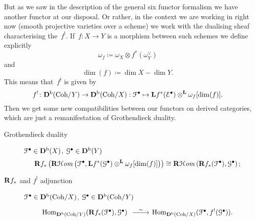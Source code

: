 But as we saw in the description of the general six functor formalism we have another functor at our disposal. Or rather, in the context we are working in right now (smooth projective varieties over a scheme) we work with the dualising sheaf characterising the~$f^!$. If~$f\colon X\to Y$ is a morphism between such schemes we define explicitly
\begin{equation}
  \omega_f\coloneqq\omega_X\otimes f^*(\omega_Y^\vee)
\end{equation}
and
\begin{equation}
  \dim(f)\coloneqq\dim X-\dim Y.
\end{equation}
This means that~$f^!$ is given by
\begin{equation}
  f^!\colon\mathbf{D}^{\mathrm{b}}(\mathrm{Coh}/Y)\to\mathbf{D}^{\mathrm{b}}(\mathrm{Coh}/X):\mathcal{F}^\bullet\mapsto\mathbf{L} f^*(\mathcal{E}^\bullet)\otimes^{\mathbf{L}}\omega_f[\dim(f)].
\end{equation}
Then we get some new compatibilities between our functors on derived categories, which are just a remanifestation of Grothendieck duality.
\begin{description}
  \item[Grothendieck duality] $\mathcal{F}^\bullet\in\mathbf{D}^{\mathrm{b}}(X)$, $\mathcal{G}^\bullet\in\mathbf{D}^{\mathrm{b}}(Y)$
    \begin{equation}
      \mathbf{R} f_*\left( \operatorname{\mathbf{R}\mathcal{H}\mathit{om}}\left( \mathcal{F}^\bullet,\mathbf{L} f^*(\mathcal{G}^\bullet)\otimes^{\mathbf{L}}\omega_f[\dim(f)] \right) \right)\cong\operatorname{\mathbf{R}\mathcal{H}\mathit{om}}\left( \mathbf{R} f_*(\mathcal{F}^\bullet),\mathcal{G}^\bullet \right);
    \end{equation}
  \item[$\mathbf{R} f_*$ and $f^!$ adjunction] $\mathcal{F}^\bullet\in\mathbf{D}^{\mathrm{b}}(\mathrm{Coh}/X)$, $\mathcal{G}^\bullet\in\mathbf{D}^{\mathrm{b}}(\mathrm{Coh}/Y)$
    \begin{equation}
      \begin{tikzcd}
        \Hom_{\derived^\bounded(\Coh/Y)}(\RRR f_*(\mathcal{F}^\bullet),\mathcal{G}^\bullet) \arrow{r}{\sim} & \Hom_{\derived^\bounded(\Coh/X)}(\mathcal{F}^\bullet,f^!(\mathcal{G}^\bullet)).
      \end{tikzcd}
    \end{equation}
\end{description}

